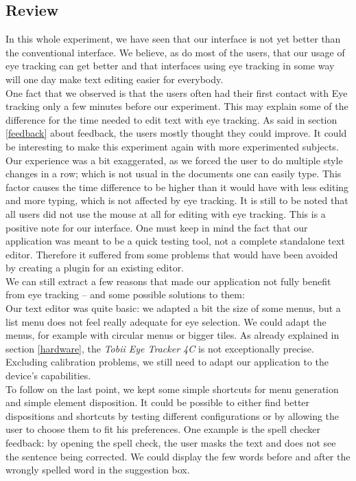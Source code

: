 \documentclass[12pt, a4paper]{article}
\begin{document}
\subsection{Review}

In this whole experiment, we have seen that our interface is not yet better than the conventional interface. We believe, as do most of the users, that our usage of eye tracking can get better and that interfaces using eye tracking in some way will one day make text editing easier for everybody. \\
One fact that we observed is that the users often had their first contact with Eye tracking only a few minutes before our experiment. This may explain some of the difference for the time needed to edit text with eye tracking. As said in section \ref{feedback} about feedback, the users mostly thought they could improve. It could be interesting to make this experiment again with more experimented subjects. \\
Our experience was a bit exaggerated, as we forced the user to do multiple style changes in a row; which is not usual in the documents one can easily type. This factor causes the time difference to be higher than it would have with less editing and more typing, which is not affected by eye tracking. 
It is still to be noted that all users did not use the mouse at all for editing with eye tracking. This is a positive note for our interface. 
One must keep in mind the fact that our application was meant to be a quick testing tool, not a complete standalone text editor. Therefore it suffered from some problems that would have been avoided by creating a plugin for an existing editor. \\
We can still extract a few reasons that made our application not fully benefit from eye tracking -- and some possible solutions to them: \\
Our text editor was quite basic: we adapted a bit the size of some menus, but a list menu does not feel really adequate for eye selection. We could adapt the menus, for example with circular menus or bigger tiles. As already explained in section \ref{hardware}, the \textit{Tobii Eye Tracker 4C} is not exceptionally precise. Excluding calibration problems, we still need to adapt our application to the device's capabilities.\\
To follow on the last point, we kept some simple shortcuts for menu generation and simple element disposition. It could be possible to either find better dispositions and shortcuts by testing different configurations or by allowing the user to choose them to fit his preferences. One example is the spell checker feedback: by opening the spell check, the user masks the text and does not see the sentence being corrected. We could display the few words before and after the wrongly spelled word in the suggestion box. 
\end{document}
